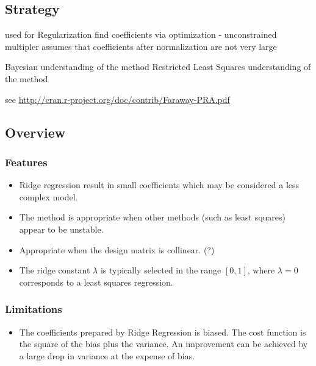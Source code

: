 \subsection{Strategy}

used for Regularization
find coefficients via optimization - unconstrained multipler
assumes that coefficients after normalization are not very large

Bayesian understanding of the method
Restricted Least Squares understanding of the method 

see \url{http://cran.r-project.org/doc/contrib/Faraway-PRA.pdf}

\subsection{Overview}

\subsubsection{Features}

\begin{itemize}
	\item Ridge regression result in small coefficients which may be considered a less complex model.
	\item The method is appropriate when other methods (such as least squares) appear to be unstable.
	\item Appropriate when the design matrix is collinear. (?)
	\item The ridge constant $\lambda$ is typically selected in the range $[0,1]$, where $\lambda = 0$ corresponds to a least squares regression.
\end{itemize}

\subsubsection{Limitations}

\begin{itemize}
	\item The coefficients prepared by Ridge Regression is biased. The cost function is the square of the bias plus the variance. An improvement can be achieved by a large drop in variance at the expense of bias.
\end{itemize}


